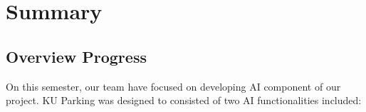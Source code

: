 \chapter{Summary}
\label{chap:summary}

\section{Overview Progress}
\label{section:overview-progress}
On this semester, our team have focused on developing AI component of our project. KU Parking was designed to consisted of two AI functionalities included: 
